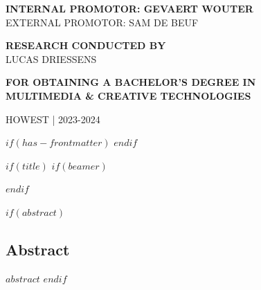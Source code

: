 \documentclass[12pt]{article}
\begin{document}
\begin{titlepage}
\begin{adjustwidth}{1.5cm}{1.5cm}
    \vspace{2em}

    \noindent\MakeUppercase{\large\textbf{Internal promotor: Gevaert Wouter}} \\
    \MakeUppercase{\large{External promotor: Sam De beuf}}

    \vspace{2em}

    \noindent\MakeUppercase{\large\textbf{Research conducted by}} \\
    \MakeUppercase{\Large{Lucas Driessens}}

    \vspace{2em}

    \noindent\MakeUppercase{\large\textbf{for obtaining a bachelor's degree in}} \\
    \MakeUppercase{\Large\textbf{Multimedia \& Creative Technologies}}

    \vspace{1em}

    \noindent\MakeUppercase{\large{Howest | 2023-2024}}
    \end{adjustwidth}
    \restoregeometry
    \normalfont
\end{titlepage}



\renewcommand{\familydefault}{\rmdefault}
\fontsize{12pt}{14pt}\selectfont



$if(has-frontmatter)$
$endif$

$if(title)$
$if(beamer)$
\frame{\titlepage}

\tableofcontents

$endif$

\setcounter{section}{0}

$if(abstract)$
\begin{center} %
\section{\centering Abstract}
\end{center}
$abstract$
\thispagestyle{empty}
\pagebreak
\restoregeometry
$endif$
\end{document}
